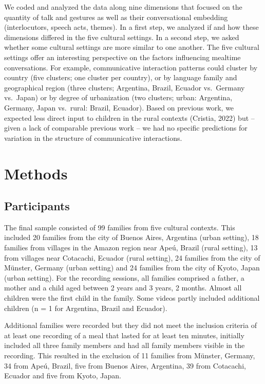 \documentclass[
  man,floatsintext]{apa6}
\begin{document}
We coded and analyzed the data along nine dimensions that focused on the quantity of talk and gestures as well as their conversational embedding (interlocutors, speech acts, themes). In a first step, we analyzed if and how these dimensions differed in the five cultural settings. In a second step, we asked whether some cultural settings are more similar to one another. The five cultural settings offer an interesting perspective on the factors influencing mealtime conversations. For example, communicative interaction patterns could cluster by country (five clusters; one cluster per country), or by language family and geographical region (three clusters; Argentina, Brazil, Ecuador vs.~Germany vs.~Japan) or by degree of urbanization (two clusters; urban: Argentina, Germany, Japan vs.~rural: Brazil, Ecuador). Based on previous work, we expected less direct input to children in the rural contexts (Cristia, 2022) but -- given a lack of comparable previous work -- we had no specific predictions for variation in the structure of communicative interactions.

\hypertarget{methods}{%
\section{Methods}\label{methods}}

\hypertarget{participants}{%
\subsection{Participants}\label{participants}}

The final sample consisted of 99 families from five cultural contexts. This included 20 families from the city of Buenos Aires, Argentina (urban setting), 18 families from villages in the Amazon region near Apeú, Brazil (rural setting), 13 from villages near Cotacachi, Ecuador (rural setting), 24 families from the city of Münster, Germany (urban setting) and 24 families from the city of Kyoto, Japan (urban setting). For the recording sessions, all families comprised a father, a mother and a child aged between 2 years and 3 years, 2 months. Almost all children were the first child in the family. Some videos partly included additional children (n = 1 for Argentina, Brazil and Ecuador).

Additional families were recorded but they did not meet the inclusion criteria of at least one recording of a meal that lasted for at least ten minutes, initially included all three family members and had all family members visible in the recording. This resulted in the exclusion of 11 families from Münster, Germany, 34 from Apeú, Brazil, five from Buenos Aires, Argentina, 39 from Cotacachi, Ecuador and five from Kyoto, Japan.
\end{document}
